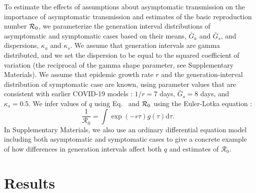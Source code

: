To estimate the effects of assumptions about asymptomatic transmission on the importance of asymptomatic transmission and estimates of the basic reproduction number ${\cal{R}}_0$, we parameterize the generation interval distributions of asymptomatic and symptomatic cases based on their means, $\bar G_a$ and $\bar G_s$, and dispersions, $\kappa_a$ and $\kappa_s$.
We assume that generation intervals are gamma distributed, and we set the dispersion to be equal to the squared coefficient of variation (the reciprocal of the gamma shape parameter, see Supplementary Materials).
We assume that epidemic growth rate $r$ and the generation-interval distribution of symptomatic case are known, using parameter values that are consistent with earlier COVID-19 models \citep{park_preprint}: $1/r=7$ days, $\bar G_s=8$ days, and $\kappa_s=0.5$.
We infer values of $q$ using Eq.~ and ${\cal{R}}_0$ using the Euler-Lotka equation \citep{lotka1907relation}:
\begin{equation}
\frac{1}{\mathcal R_0} = \int \exp(-r \tau) g(\tau) \mathrm{d} \tau.
\end{equation}
In Supplementary Materials, we also use an ordinary differential equation model including both asymptomatic and symptomatic cases to give a concrete example of how differences in generation intervals affect both $q$ and estimates of $\mathcal R_0$.

\section{Results}

